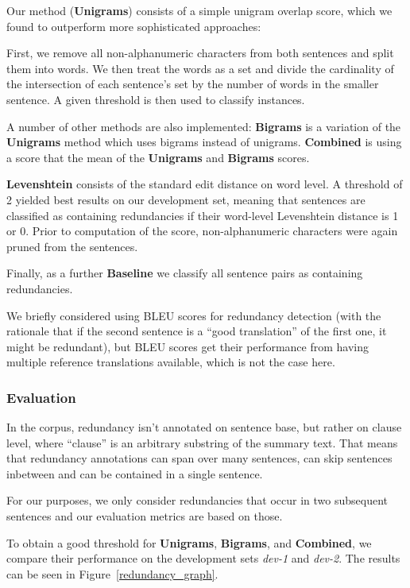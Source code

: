 \documentclass[a4paper,10pt]{scrartcl}
\theoremstyle{style}
\begin{document}
Our method (\textbf{Unigrams}) consists of a simple unigram overlap score, which we found to outperform more sophisticated approaches:

First, we remove all non-alphanumeric characters from both sentences and split them into words. We then treat the words as a set and divide the cardinality of the intersection of each sentence's set by the number of words in the smaller sentence. A given threshold is then used to classify instances.

A number of other methods are also implemented: \textbf{Bigrams} is a variation of the \textbf{Unigrams} method which uses bigrams instead of unigrams. \textbf{Combined} is using a score that the mean of the \textbf{Unigrams} and \textbf{Bigrams} scores.

\textbf{Levenshtein} consists of the standard edit distance\citep{levenshtein1966binary} on word level. A threshold of 2 yielded best results on our development set, meaning that sentences are classified as containing redundancies if their word-level Levenshtein distance is 1 or 0. Prior to computation of the score, non-alphanumeric characters were again pruned from the sentences.

Finally, as a further \textbf{Baseline} we classify all sentence pairs as containing redundancies.

We briefly considered using BLEU scores \citep{papineni2002bleu} for redundancy detection (with the rationale that if the second sentence is a ``good translation'' of the first one, it might be redundant), but BLEU scores get their performance from having multiple reference translations available, which is not the case here.

\subsubsection{Evaluation}

In the corpus, redundancy isn't annotated on sentence base, but rather on clause level, where ``clause'' is an arbitrary substring of the summary text. That means that redundancy annotations can span over many sentences, can skip sentences inbetween and can be contained in a single sentence.

For our purposes, we only consider redundancies that occur in two subsequent sentences and our evaluation metrics are based on those.

To obtain a good threshold for \textbf{Unigrams}, \textbf{Bigrams}, and \textbf{Combined}, we compare their performance on the development sets \textit{dev-1} and \textit{dev-2}. The results can be seen in Figure~\ref{redundancy_graph}.
\end{document}
